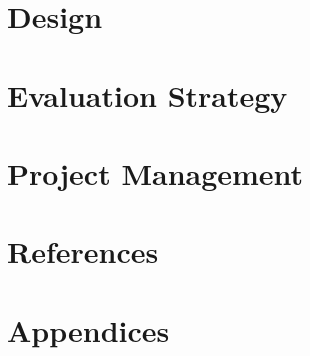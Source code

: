 \documentclass[a4paper,11pt]{article}
\begin{document}
\section{Design}

\section{Evaluation Strategy}

\section{Project Management}

\section*{References}

\section*{Appendices}
\end{document}
